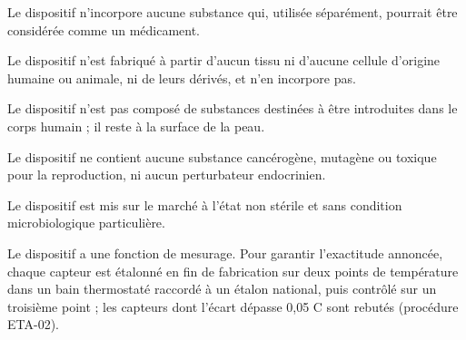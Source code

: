 \documentclass[11pt,a4paper]{article}
\begin{document}
\begin{Form}
{\small Le dispositif n'incorpore aucune substance qui, utilisée séparément, pourrait être considérée comme un médicament.}\par

{\small Le dispositif n'est fabriqué à partir d'aucun tissu ni d'aucune cellule d'origine humaine ou animale, ni de leurs dérivés, et n'en incorpore pas.}\par

{\small Le dispositif n'est pas composé de substances destinées à être introduites dans le corps humain ; il reste à la surface de la peau.}\par

{\small Le dispositif ne contient aucune substance cancérogène, mutagène ou toxique pour la reproduction, ni aucun perturbateur endocrinien.}\par

{\small Le dispositif est mis sur le marché à l'état non stérile et sans condition microbiologique particulière.}\par

{\small Le dispositif a une fonction de mesurage. Pour garantir l'exactitude annoncée, chaque capteur est étalonné en fin de fabrication sur deux points de température dans un bain thermostaté raccordé à un étalon national, puis contrôlé sur un troisième point ; les capteurs dont l'écart dépasse 0,05 \textdegree{}C sont rebutés (procédure ETA-02).}\par


\end{Form}
\end{document}
